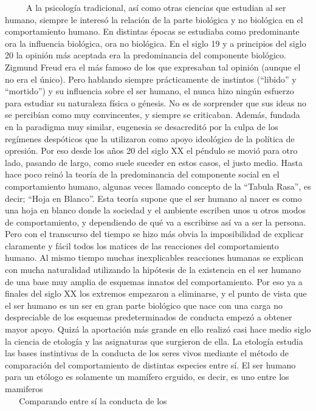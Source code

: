 ~ ~ ~ A la psicología tradicional, así como otras ciencias que estudian
al ser humano, siempre le interesó la relación de la parte biológica y
no biológica en el comportamiento humano. En distintas épocas se
estudiaba como predominante ora la influencia biológica, ora no
biológica. En el siglo 19 y a principios del siglo 20 la opinión más
aceptada era la predominancia del componente biológico. Zigmund Freud
era el más famoso de los que expresaban tal opinión (aunque el no era el
único). Pero hablando siempre prácticamente de instintos (``libido'' y
``mortido'') y su influencia sobre el ser humano, el nunca hizo ningún
esfuerzo para estudiar su naturaleza física o génesis. No es de
sorprender que sus ideas no se percibían como muy convincentes, y
siempre se criticaban. Además, fundada en la paradigma muy similar,
eugenesia se desacreditó por la culpa de los regímenes despóticos que la
utilizaron como apoyo ideológico de la política de opresión. Por eso
desde los años 20 del siglo XX el péndulo se movió para otro lado,
pasando de largo, como suele suceder en estos casos, el justo medio.
Hasta hace poco reinó la teoría de la predominancia del componente
social en el comportamiento humano, algunas veces llamado concepto de la
``Tabula Rasa'', es decir; ``Hoja en Blanco''. Esta teoría supone que el
ser humano al nacer es como una hoja en blanco donde la sociedad y el
ambiente escriben unos u otros modos de comportamiento, y dependiendo de
qué va a escribirse así va a ser la persona. Pero con el transcurso del
tiempo se hizo más obvia la imposibilidad de explicar claramente y fácil
todos los matices de las reacciones del comportamiento humano. Al mismo
tiempo muchas inexplicables reacciones humanas se explican con mucha
naturalidad utilizando la hipótesis de la existencia en el ser humano de
una base muy amplia de esquemas innatos del comportamiento. Por eso ya a
finales del siglo XX los extremos empezaron a eliminarse, y el punto de
vista que el ser humano es un ser en gran parte biológico que nace con
una carga no despreciable de los esquemas predeterminados de conducta
empezó a obtener mayor apoyo. Quizá la aportación más grande en ello
realizó casi hace medio siglo la ciencia de etología y las asignaturas
que surgieron de ella. La etología estudia las bases instintivas de la
conducta de los seres vivos mediante el método de comparación del
comportamiento de distintas especies entre sí. El ser humano para un
etólogo es solamente un mamífero erguido, es decir, es uno entre los
mamiferos\\
\hspace*{0.333em} ~ ~ Comparando entre sí la conducta de los
